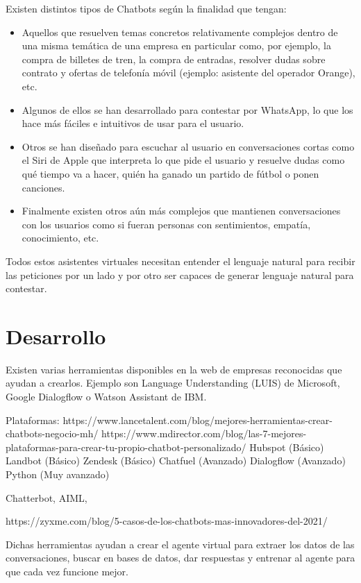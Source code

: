 Existen distintos tipos de Chatbots según la finalidad que tengan:
\begin{itemize}
	\item Aquellos que resuelven temas concretos relativamente complejos dentro de una misma temática de una empresa en particular como, por ejemplo, la compra de billetes de tren, la compra de entradas, resolver dudas sobre contrato y ofertas de telefonía móvil (ejemplo: asistente del operador Orange), etc.
	
	\item Algunos de ellos se han desarrollado para contestar por WhatsApp, lo que los hace más fáciles e intuitivos de usar para el usuario.
	
	\item Otros se han diseñado para escuchar al usuario en conversaciones cortas como el Siri de Apple que interpreta lo que pide el usuario y resuelve dudas como qué tiempo va a hacer, quién ha ganado un partido de fútbol o ponen canciones.
	
	\item Finalmente existen otros aún más complejos que mantienen conversaciones con los usuarios como si fueran personas con sentimientos, empatía, conocimiento, etc.
\end{itemize}

Todos estos asistentes virtuales necesitan entender el lenguaje natural para recibir las peticiones por un lado y por otro ser capaces de generar lenguaje natural para contestar. 


\section{Desarrollo}

Existen varias herramientas disponibles en la web de empresas reconocidas que ayudan a crearlos. Ejemplo son Language Understanding (LUIS) de Microsoft, Google Dialogflow o Watson Assistant de IBM.

Plataformas:
https://www.lancetalent.com/blog/mejores-herramientas-crear-chatbots-negocio-mh/ 
https://www.mdirector.com/blog/las-7-mejores-plataformas-para-crear-tu-propio-chatbot-personalizado/
Hubspot (Básico)
Landbot (Básico)
Zendesk (Básico)
Chatfuel (Avanzado)
Dialogflow (Avanzado)
Python (Muy avanzado)


Chatterbot, AIML, 

https://zyxme.com/blog/5-casos-de-los-chatbots-mas-innovadores-del-2021/

Dichas herramientas ayudan a crear el agente virtual para extraer los datos de las conversaciones, buscar en bases de datos, dar respuestas y entrenar al agente para que cada vez funcione mejor.

